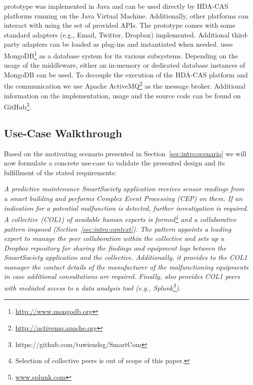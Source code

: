   
  \mdl{} prototype
  was implemented in Java and can be used directly by HDA-CAS platforms running on the Java Virtual Machine. Additionally, other platforms can interact with \mdl{} using the set of provided APIs\footnotemark. 
  The prototype comes with some standard adapters (e.g., Email, Twitter, Dropbox) implemented. 
  Additional third-party adapters can be loaded as plug-ins and instantiated when needed.
  \mdl{} uses MongoDB\footnote{\url{http://www.mongodb.org}} as a database system for its various subsystems. Depending on the usage of the middleware, either an in-memory or dedicated database instances of MongoDB can be used. To decouple the execution of the HDA-CAS platform and the communication we use Apache ActiveMQ\footnote{\url{http://activemq.apache.org}} as the message broker.
  Additional information on the implementation, usage and the source code can be found on GitHub\footnote{https://github.com/tuwiendsg/SmartCom}. 



  \subsection{Use-Case Walkthrough}

    Based on the motivating scenario presented in Section~\ref{sec:intro:scenario} we will now formulate a concrete use-case to validate the presented design and its fulfillment of the stated requirements:

    \emph{A predictive maintenance SmartSociety application receives sensor readings from a smart building and performs Complex Event Processing (CEP) on them. If an indication for a potential malfunction is detected, further investigation is required. A collective (COL1) of available human experts is formed\footnote{Selection of collective peers is out of scope of this paper.} and a collaborative pattern imposed (Section~\ref{sec:intro:context}). The pattern appoints a leading expert to manage the peer collaboration within the collective and sets up a Dropbox repository for sharing the findings and equipment logs between the SmartSociety application and the collective. Additionally, it provides to the COL1 manager the contact details of the manufacturer of the malfunctioning equipments in case additional consultations are required. Finally, \mdl{} also provides COL1 peers with mediated access to a data analysis tool (e.g., Splunk\footnote{\url{www.splunk.com}}).
    }

    
